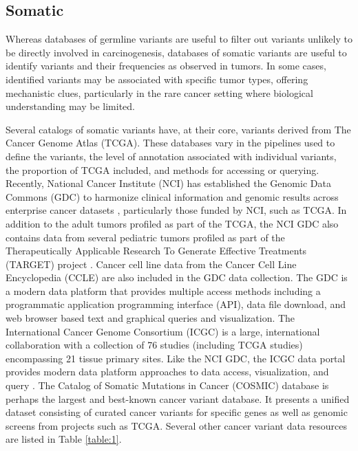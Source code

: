 \documentclass{article}
\begin{document}
\subsection{Somatic}

Whereas databases of germline variants are useful to filter
out variants unlikely to be directly involved in carcinogenesis,
databases of somatic variants are useful to identify variants and
their frequencies as observed in tumors. In some cases, identified
variants may be associated with specific tumor types, offering
mechanistic clues, particularly in the rare cancer setting where
biological understanding may be limited.

Several catalogs of somatic variants have, at their core, variants
derived from The Cancer Genome Atlas (TCGA). These databases vary in
the pipelines used to define the variants, the level of annotation
associated with individual variants, the proportion of TCGA included,
and methods for accessing or querying. Recently, National Cancer
Institute (NCI) has established the Genomic Data Commons (GDC) to
harmonize clinical information and genomic results across enterprise
cancer datasets \parencite{Grossman2016-sk}, particularly those funded by
NCI, such as TCGA. In addition to the adult tumors profiled as part of
the TCGA, the NCI GDC also contains data from several pediatric tumors
profiled as part of the Therapeutically Applicable Research To
Generate Effective Treatments (TARGET) project
\parencite{noauthor_undated-ax}. Cancer cell line data from the Cancer Cell
Line Encyclopedia (CCLE) are also included \parencite{Barretina2012-yz} in
the GDC data collection. The GDC is a modern data platform that
provides multiple access methods including a programmatic application
programming interface (API), data file download, and web browser based
text and graphical queries and visualization. The International Cancer
Genome Consortium (ICGC) is a large, international collaboration with
a collection of 76 studies (including TCGA studies) encompassing 21
tissue primary sites. Like the NCI GDC, the ICGC data portal provides
modern data platform approaches to data access, visualization, and
query \parencite{Zhang2011-bl}. The Catalog of Somatic Mutations in Cancer
(COSMIC) database is perhaps the largest and best-known cancer variant
database. It presents a unified dataset consisting of curated cancer
variants for specific genes as well as genomic screens from projects
such as TCGA. Several other cancer variant data resources are listed
in Table \ref{table:1}.
\end{document}
